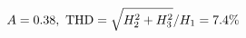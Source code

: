 \documentclass[preview]{standalone}
\begin{document}
\begin{align*}
\special{dvisvgm:raw <g id='unique000'>}A=0.38,\ \text{THD}=\sqrt{H_2^2+H_3^2}/H_1=7.4\%\special{dvisvgm:raw </g>}
\end{align*}
\end{document}
